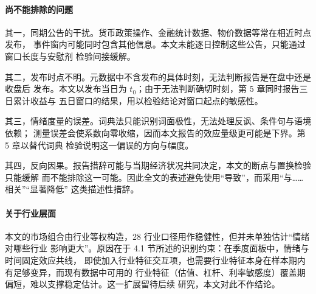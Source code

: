 \paragraph{尚不能排除的问题}
其一，同期公告的干扰。货币政策操作、金融统计数据、物价数据等常在相近时点发布，
事件窗内可能同时包含其他信息。本文未能逐日控制这些公告，只能通过窗口长度与安慰剂
检验间接缓解。

其二，发布时点不明。元数据中不含发布的具体时刻，无法判断报告是在盘中还是收盘后
发布。本文以发布当日为 $t_0$；由于无法判断确切时刻，第 5 章同时报告三日累计收益与
五日窗口的结果，用以检验结论对窗口起点的敏感性。

其三，情绪度量的误差。词典法只能识别词面极性，无法处理反讽、条件句与语境依赖；
测量误差会使系数向零收缩，因而本文报告的效应量级更可能是下界。第 5 章以替代词典
检验说明这一偏误的方向与幅度。

其四，反向因果。报告措辞可能与当期经济状况共同决定，本文的断点与置换检验只能缓解
而不能排除这一可能。因此全文的表述避免使用“导致”，而采用“与……相关”“显著降低”
这类描述性措辞。

\paragraph{关于行业层面}
本文的市场组合由行业等权构造，28 行业口径用作稳健性，但并未单独估计“情绪对哪些行业
影响更大”。原因在于 4.1 节所述的识别约束：在季度面板中，情绪与时间固定效应共线，
即使加入行业特征交互项，也需要行业特征本身在样本期内有足够变异，而现有数据中可用的
行业特征（估值、杠杆、利率敏感度）覆盖期偏短，难以支撑稳定估计。这一扩展留待后续
研究，本文对此不作结论。
